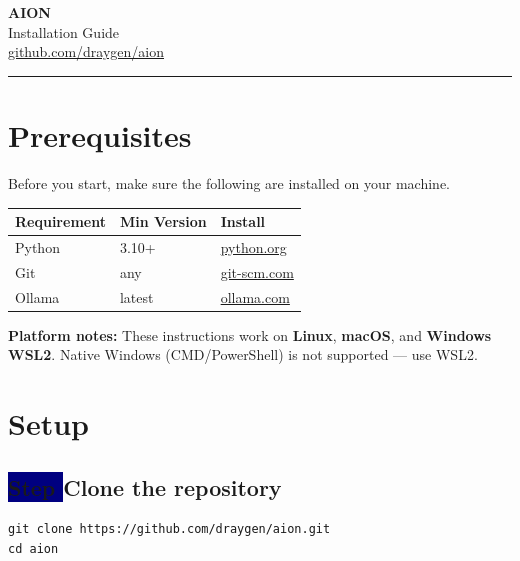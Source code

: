 \documentclass[11pt,a4paper]{article}
\newcounter{step}
\newcommand{\step}[1]{%
  \stepcounter{step}%
  \subsection*{\colorbox{navy}{\color{white}\;\textbf{Step \thestep}\;}\quad #1}%
}
\begin{document}
\begin{center}
  {\fontsize{28}{34}\selectfont\bfseries\color{navy} AION}\\[4pt]
  {\large\color{muted} Installation Guide}\\[6pt]
  {\small\color{muted}
    \href{https://github.com/draygen/aion}{github.com/draygen/aion}}
\end{center}
\vspace{4pt}
\noindent\color{accent}\hrule height 2pt
\vspace{14pt}

\section{Prerequisites}

Before you start, make sure the following are installed on your machine.

\vspace{6pt}
\begin{tabularx}{\linewidth}{M{3.2cm} M{2.8cm} X}
  \toprule
  \color{white}\textbf{Requirement} & \color{white}\textbf{Min Version} & \color{white}\textbf{Install} \\
  \midrule
  Python        & 3.10+  & \href{https://python.org}{python.org} \\
  Git           & any    & \href{https://git-scm.com}{git-scm.com} \\
  Ollama        & latest & \href{https://ollama.com}{ollama.com} \\
  \bottomrule
\end{tabularx}

\begin{infobox}
  \textbf{Platform notes:}
  These instructions work on \textbf{Linux}, \textbf{macOS}, and \textbf{Windows WSL2}.
  Native Windows (CMD/PowerShell) is not supported — use WSL2.
\end{infobox}

\section{Setup}

\step{Clone the repository}

\begin{lstlisting}
git clone https://github.com/draygen/aion.git
cd aion
\end{lstlisting}
\end{document}
